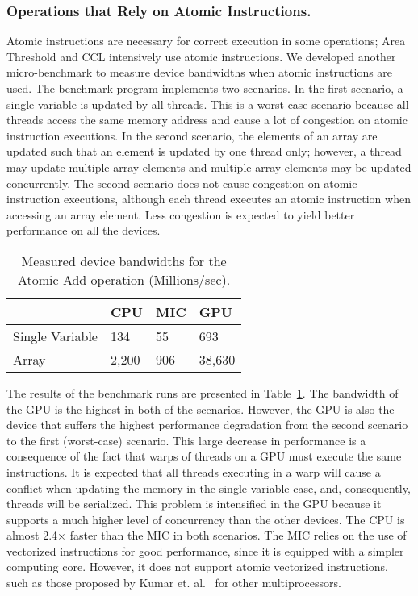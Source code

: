 \subsubsection{Operations that Rely on Atomic Instructions.} 
Atomic instructions are necessary for correct execution in some operations; Area 
Threshold and CCL intensively use atomic instructions. We developed
another micro-benchmark to measure device bandwidths when atomic 
instructions are used. The benchmark program implements two scenarios. In the first 
scenario, a single variable is updated by all threads. This is a worst-case scenario 
because all threads access the same memory address and cause a lot of congestion on 
atomic instruction executions. In the second scenario, the elements of an array are 
updated such that an element is updated by one thread only; however, a thread may update 
multiple array elements and multiple array elements may be updated concurrently. The 
second scenario does not cause congestion on atomic instruction executions, although 
each thread executes an atomic instruction when accessing an array element. Less 
congestion is expected to yield better performance on all the devices. 
\begin{table}[h!]
\caption{Measured device bandwidths for the Atomic Add operation (Millions/sec).}
\vspace*{-2ex}
\begin{center}
\begin{tabular}{l l l l}
\hline
   		& CPU	& MIC		&	GPU 	\\ \hline \hline
Single Variable	& 134	& 55		&	693	\\ \hline
Array		& 2,200	& 906		&	38,630  \\ \hline
\end{tabular}
\end{center}
\label{tab:atomic}
\vspace*{-2ex}
\end{table}

The results of the benchmark runs are presented in Table~\ref{tab:atomic}. 
The bandwidth of the GPU is the highest in both of the scenarios. However, 
the GPU is also the
device that suffers the highest performance degradation from the second 
scenario to the first (worst-case) scenario. This large decrease in 
performance 
is a consequence of the fact that warps of threads on a GPU must
execute the same instructions. It is expected that all threads
executing in a warp will cause a conflict when updating the memory 
in the single variable case, and, consequently, threads will be 
serialized. This problem is
intensified in the GPU because it supports a much higher level of concurrency
than the other devices. The CPU is almost 2.4$\times$
faster than the MIC in both scenarios. The MIC relies on the use of
vectorized instructions for good performance, since it is equipped with
a simpler computing core. However, it does not support atomic vectorized
instructions, such as those proposed by Kumar et. al.~\cite{4556746} for other
multiprocessors. 

